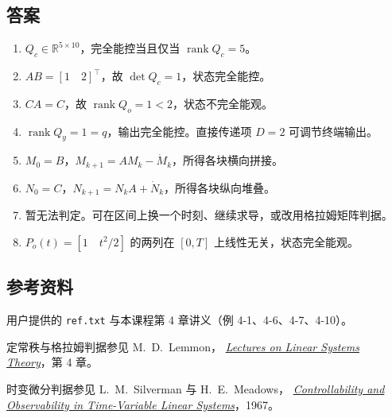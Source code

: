 \documentclass[UTF8,a4paper,12pt,fontset=fandol]{ctexart}
\DeclareMathOperator{\rank}{rank}
\begin{document}
\subsection*{答案}
\begin{enumerate}
  \item $Q_c\in\mathbb R^{5\times10}$，完全能控当且仅当 $\rank Q_c=5$。
  \item $AB=[1\quad 2]^\top$，故 $\det Q_c=1$，状态完全能控。
  \item $CA=C$，故 $\rank Q_o=1<2$，状态不完全能观。
  \item $\rank Q_y=1=q$，输出完全能控。直接传递项 $D=2$ 可调节终端输出。
  \item $M_0=B$，$M_{k+1}=AM_k-\dot M_k$，所得各块横向拼接。
  \item $N_0=C$，$N_{k+1}=N_kA+\dot N_k$，所得各块纵向堆叠。
  \item 暂无法判定。可在区间上换一个时刻、继续求导，或改用格拉姆矩阵判据。
  \item $P_o(t)=[1\quad t^2/2]$ 的两列在 $[0,T]$ 上线性无关，状态完全能观。
\end{enumerate}

\subsection*{参考资料}
\small
用户提供的 \texttt{ref.txt} 与本课程第 4 章讲义（例 4-1、4-6、4-7、4-10）。

定常秩与格拉姆判据参见 M.~D.~Lemmon，
\href{https://www3.nd.edu/~lemmon/courses/linear-systems/lecture-book/linsys-book-2024.pdf}{\textit{Lectures on Linear Systems Theory}}，第 4 章。

时变微分判据参见 L.~M.~Silverman 与 H.~E.~Meadows，
\href{https://doi.org/10.1137/0305005}{\textit{Controllability and Observability in Time-Variable Linear Systems}}，1967。
\end{document}
